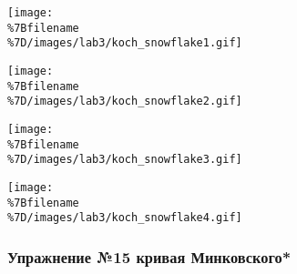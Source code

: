 \texttt{[image: \\\%7Bfilename\\\%7D/images/lab3/koch\_snowflake1.gif]}

\texttt{[image: \\\%7Bfilename\\\%7D/images/lab3/koch\_snowflake2.gif]}

\texttt{[image: \\\%7Bfilename\\\%7D/images/lab3/koch\_snowflake3.gif]}

\texttt{[image: \\\%7Bfilename\\\%7D/images/lab3/koch\_snowflake4.gif]}

\begin{Shaded}
\begin{Highlighting}[]
 

 
     \OperatorTok{==} \NormalTok{:}
    \NormalTok{:}
        \OperatorTok{/}\NormalTok{)}
        \NormalTok{)}
        \OperatorTok{/}\NormalTok{)}
        \NormalTok{)}
        \OperatorTok{/}\NormalTok{)}
        \NormalTok{)}
        \OperatorTok{/}\NormalTok{)}

 
      \NormalTok{(}\NormalTok{):}
        \NormalTok{)}

\OperatorTok{=} 
\OperatorTok{=} \OperatorTok{/}\OperatorTok{*}\OperatorTok{**}
\OperatorTok{=} 

\OperatorTok{-}\OperatorTok{/}

\NormalTok{)}
\end{Highlighting}
\end{Shaded}

\subsubsection{Упражнение №15 кривая
Минковского*}\label{ux443ux43fux440ux430ux436ux43dux435ux43dux438ux435-15-ux43aux440ux438ux432ux430ux44f-ux43cux438ux43dux43aux43eux432ux441ux43aux43eux433ux43e}

